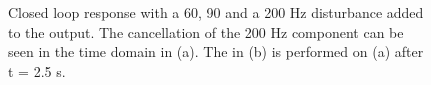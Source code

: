 \begin{figure}[h!]
  \centering %
  \qquad
  \caption{\label{fig:1_dist_both} Closed loop response with a 60, 90 and a 200 Hz disturbance added to the output. The cancellation of the 200 Hz component can be seen in the time domain in (a). The \abbrFFT in (b) is performed on (a) after t = 2.5 s.}
\end{figure}

